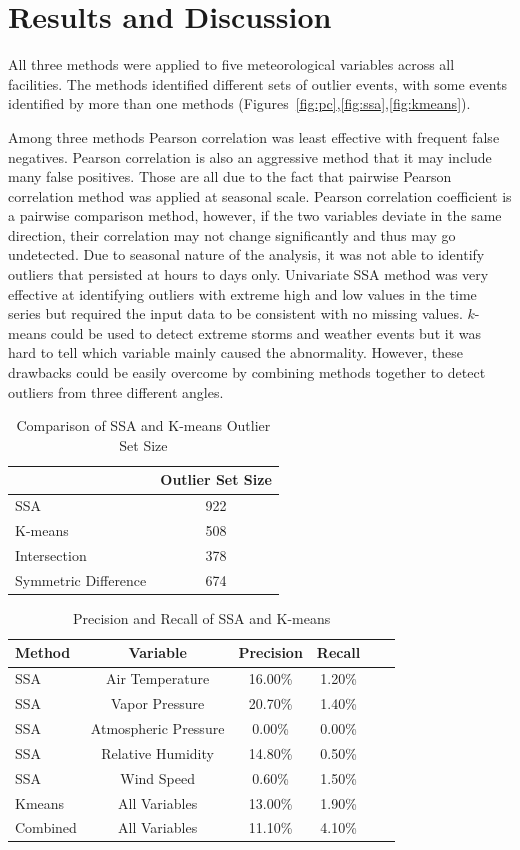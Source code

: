 \section{Results and Discussion}
All three methods were applied to five meteorological variables across
all facilities. The methods identified different sets of outlier events,
with some events identified by more than one methods
(Figures~\ref{fig:pc},\ref{fig:ssa},\ref{fig:kmeans}).

Among three methods Pearson correlation was least effective with
frequent false negatives. Pearson correlation is also an aggressive method that
it may include many false positives. Those are all due to the fact 
that pairwise Pearson correlation method was applied at seasonal scale.
Pearson correlation coefficient is a pairwise comparison method, however, 
if the two variables deviate in the same direction, their correlation 
may not change significantly and thus may go undetected. Due to seasonal
nature of the analysis, it was not able to identify outliers that
persisted at hours to days only. Univariate SSA method was very effective 
at identifying outliers with extreme high and low values in the time series 
but required the input data to be consistent with no missing values.
$k$-means could be used to detect extreme storms and weather events but it was hard
to tell which variable mainly caused the abnormality. However, these drawbacks 
could be easily overcome by combining methods together to detect 
outliers from three different angles.

\begin{table}[ht]
\caption{Comparison of SSA and K-means Outlier Set Size}
\label{tab:comp}
\centering
\begin{tabular}{|l|c|}
\cline{2-2}
\multicolumn{1}{l|}{} & Outlier Set Size\\
\hline
SSA & 922\\
K-means & 508\\
Intersection & 378\\
Symmetric Difference & 674\\
\hline
\end{tabular}
\end{table}

\begin{table}[ht]
\caption{Precision and Recall of SSA and K-means}
\label{tab:pr}
\centering
\begin{tabular}{|l|c|c|c|c|c|}
\hline
Method & Variable & Precision & Recall\\
\hline
SSA & Air Temperature & 16.00\% & 1.20\%\\
SSA & Vapor Pressure & 20.70\% & 1.40\%\\
SSA & Atmospheric Pressure & 0.00\% & 0.00\%\\
SSA & Relative Humidity & 14.80\% & 0.50\%\\
SSA & Wind Speed & 0.60\% & 1.50\%\\
Kmeans & All Variables & 13.00\% & 1.90\%\\
Combined & All Variables & 11.10\% & 4.10\%\\
\hline
\end{tabular}
\end{table}

